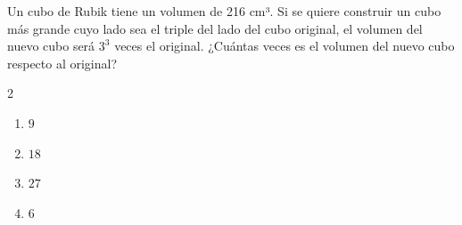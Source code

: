 Un cubo de Rubik tiene un volumen de 216 cm³. Si se quiere construir un cubo más grande cuyo lado sea el triple del lado del cubo original, el volumen del nuevo cubo será $3^3$ veces el original. ¿Cuántas veces es el volumen del nuevo cubo respecto al original?

\begin{multicols}{2}
\begin{enumerate}[label=\alph*)]
\item $9$
\item $18$
\item $27$
\item $6$
\end{enumerate}
\end{multicols}
